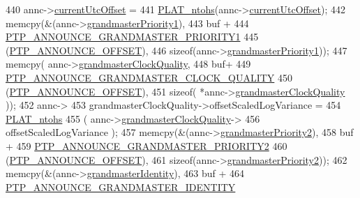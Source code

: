 \begin{DoxyCode}
{{{{{{{{440             annc->\hyperlink{class_p_t_p_message_announce_a4ee8eca04b1ccd7d8eaae5f0dd3a11fa}{currentUtcOffset} =
441                 \hyperlink{linux_2src_2platform_8cpp_a6b8f3e7b87b66fa774a07ddc67f883a7}{PLAT\_ntohs}(annc->\hyperlink{class_p_t_p_message_announce_a4ee8eca04b1ccd7d8eaae5f0dd3a11fa}{currentUtcOffset});
442             memcpy(&(annc->\hyperlink{class_p_t_p_message_announce_a93988c82dd819cc976c32f9e006b97e3}{grandmasterPriority1}),
443                    buf +
444                    \hyperlink{avbts__message_8hpp_acd2f076b6ef0a6a45ac42baf1aecd300}{PTP\_ANNOUNCE\_GRANDMASTER\_PRIORITY1}
445                    (\hyperlink{avbts__message_8hpp_aaa3da4fa4e9e4cfe49477cd7f6b95bca}{PTP\_ANNOUNCE\_OFFSET}),
446                    \textcolor{keyword}{sizeof}(annc->\hyperlink{class_p_t_p_message_announce_a93988c82dd819cc976c32f9e006b97e3}{grandmasterPriority1}));
447             memcpy( annc->\hyperlink{class_p_t_p_message_announce_aa67cf6cb88ed67b2850993312a7cd5f2}{grandmasterClockQuality},
448                 buf+
449                 \hyperlink{avbts__message_8hpp_a972816df3b21a89930e21ac6a9617408}{PTP\_ANNOUNCE\_GRANDMASTER\_CLOCK\_QUALITY}
450                 (\hyperlink{avbts__message_8hpp_aaa3da4fa4e9e4cfe49477cd7f6b95bca}{PTP\_ANNOUNCE\_OFFSET}),
451                 \textcolor{keyword}{sizeof}( *annc->\hyperlink{class_p_t_p_message_announce_aa67cf6cb88ed67b2850993312a7cd5f2}{grandmasterClockQuality} ));
452             annc->
453               grandmasterClockQuality->offsetScaledLogVariance =
454               \hyperlink{linux_2src_2platform_8cpp_a6b8f3e7b87b66fa774a07ddc67f883a7}{PLAT\_ntohs}
455               ( annc->\hyperlink{class_p_t_p_message_announce_aa67cf6cb88ed67b2850993312a7cd5f2}{grandmasterClockQuality}->
456                 offsetScaledLogVariance );
457             memcpy(&(annc->\hyperlink{class_p_t_p_message_announce_a1e9e3c7867bf9eb557e5cf6edbd7f54a}{grandmasterPriority2}),
458                    buf +
459                    \hyperlink{avbts__message_8hpp_ad08230d0bcb3b40a12153ace07e585f9}{PTP\_ANNOUNCE\_GRANDMASTER\_PRIORITY2}
460                    (\hyperlink{avbts__message_8hpp_aaa3da4fa4e9e4cfe49477cd7f6b95bca}{PTP\_ANNOUNCE\_OFFSET}),
461                    \textcolor{keyword}{sizeof}(annc->\hyperlink{class_p_t_p_message_announce_a1e9e3c7867bf9eb557e5cf6edbd7f54a}{grandmasterPriority2}));
462             memcpy(&(annc->\hyperlink{class_p_t_p_message_announce_aac45d13272e7f5bd9b06d2bf44c012af}{grandmasterIdentity}),
463                    buf +
464                    \hyperlink{avbts__message_8hpp_a822a74880e223c13025df7bbfa545b63}{PTP\_ANNOUNCE\_GRANDMASTER\_IDENTITY}
}}}}}}}}
\end{DoxyCode}
